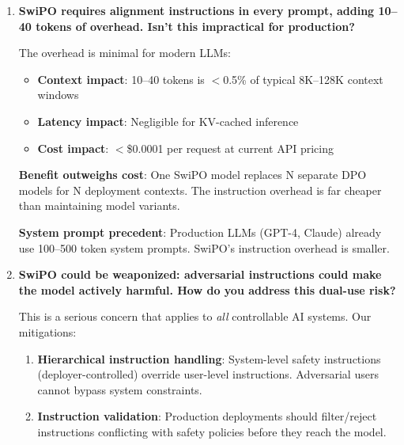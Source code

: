 \begin{enumerate}[label=\textbf{Q\arabic*.}, leftmargin=*, itemsep=8pt]
\textbf{Practical cost}: Total training time is $\sim$4.5 hours on A100-40GB. The complexity is in methodology, not compute.

\vspace{4mm}

\item \textbf{SwiPO requires alignment instructions in every prompt, adding 10--40 tokens of overhead. Isn't this impractical for production?}

 The overhead is minimal for modern LLMs:

\begin{itemize}[leftmargin=*,itemsep=2pt]
    \item \textbf{Context impact}: 10--40 tokens is $<$0.5\% of typical 8K--128K context windows
    \item \textbf{Latency impact}: Negligible for KV-cached inference
    \item \textbf{Cost impact}: $<$\$0.0001 per request at current API pricing
\end{itemize}

\textbf{Benefit outweighs cost}: One SwiPO model replaces N separate DPO models for N deployment contexts. The instruction overhead is far cheaper than maintaining model variants.

\textbf{System prompt precedent}: Production LLMs (GPT-4, Claude) already use 100--500 token system prompts. SwiPO's instruction overhead is smaller.

\vspace{4mm}

\item \textbf{SwiPO could be weaponized: adversarial instructions could make the model actively harmful. How do you address this dual-use risk?}

 This is a serious concern that applies to \textit{all} controllable AI systems. Our mitigations:

\begin{enumerate}[leftmargin=*,itemsep=2pt]
    \item \textbf{Hierarchical instruction handling}: System-level safety instructions (deployer-controlled) override user-level instructions. Adversarial users cannot bypass system constraints.

    \item \textbf{Instruction validation}: Production deployments should filter/reject instructions conflicting with safety policies before they reach the model.


\end{enumerate}
\end{enumerate}
